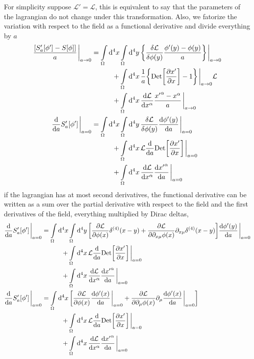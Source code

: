 For simplicity suppose $\mathcal L'=\mathcal L$, this is equivalent to say that the parameters of the 
lagrangian do not change under this transformation. Also, we fatorize the variation with respect to the 
field as a functional derivative and divide everything by $a$
\begin{align}
    \frac{\qty[S_a'\qty[\phi']-S\qty[\phi]]}{a} \eval_{a\rightarrow 0}&= \int\limits_{\Omega}\dd[4]{x}\int\limits_{\Omega}\dd[4]{y}\qty{\fdv{\mathcal L}{\phi\qty(y)}\frac{\phi'\qty(y)-\phi\qty(y)}{a}}\eval_{a\rightarrow0}\nonumber\\
    &\quad\quad\quad+\int\limits_{\Omega}\dd[4]{x}\frac1a\qty{\Det\qty[\pdv{x'}{x}]-1}\eval_{a\rightarrow 0}\mathcal L\nonumber\\
    &\quad\quad\quad+\int\limits_{\Omega}\dd[4]{x}\dv{\mathcal L}{x^\alpha}\frac{{x'}^\alpha-x^\alpha}{a}\eval_{a\rightarrow 0}\nonumber\\
    \dv{}{a}S_a'\qty[\phi']\eval_{a=0}&= \int\limits_{\Omega}\dd[4]{x}\int\limits_{\Omega}\dd[4]{y}\fdv{\mathcal L}{\phi\qty(y)}\dv{\phi'\qty(y)}{a}\eval_{a=0}\nonumber\\
    &\quad\quad\quad+\int\limits_{\Omega}\dd[4]{x}\mathcal L\dv{}{a}\Det\qty[\pdv{x'}{x}]\eval_{a= 0}\nonumber\\
    &\quad\quad\quad+\int\limits_{\Omega}\dd[4]{x}\dv{\mathcal L}{x^\alpha}\dv{{x'}^\alpha}{a}\eval_{a=0}
\end{align}
if the lagrangian has at most second derivatives, the functional derivative 
can be written as a sum over the partial derivative with respect to the field and the 
first derivatives of the field, everything multiplied by Dirac deltas,
\begin{align}
    \dv{}{a}S_a'\qty[\phi']\eval_{a=0}&= \int\limits_{\Omega}\dd[4]{x}\int\limits_{\Omega}\dd[4]{y}\qty[\pdv{\mathcal L}{\phi\qty(x)}\delta^{\qty(4)}\qty(x-y)+\pdv{\mathcal L}{\partial_{x\mu}\phi\qty(x)}\partial_{x\mu}\delta^{\qty(4)}\qty(x-y)]\dv{\phi'\qty(y)}{a}\eval_{a=0}\nonumber\\
    &\quad\quad\quad+\int\limits_{\Omega}\dd[4]{x}\mathcal L\dv{}{a}\Det\qty[\pdv{x'}{x}]\eval_{a= 0}\nonumber\\
    &\quad\quad\quad+\int\limits_{\Omega}\dd[4]{x}\dv{\mathcal L}{x^\alpha}\dv{{x'}^\alpha}{a}\eval_{a=0}\\
    \dv{}{a}S_a'\qty[\phi']\eval_{a=0}&= \int\limits_{\Omega}\dd[4]{x}\qty[\pdv{\mathcal L}{\phi\qty(x)}\dv{\phi'\qty(x)}{a}\eval_{a=0}+\pdv{\mathcal L}{\partial_{\mu}\phi\qty(x)}\partial_{\mu}\dv{\phi'\qty(x)}{a}\eval_{a=0}]\nonumber\\
    &\quad\quad\quad+\int\limits_{\Omega}\dd[4]{x}\mathcal L\dv{}{a}\Det\qty[\pdv{x'}{x}]\eval_{a= 0}\nonumber\\
    &\quad\quad\quad+\int\limits_{\Omega}\dd[4]{x}\dv{\mathcal L}{x^\alpha}\dv{{x'}^\alpha}{a}\eval_{a=0}
\end{align}
